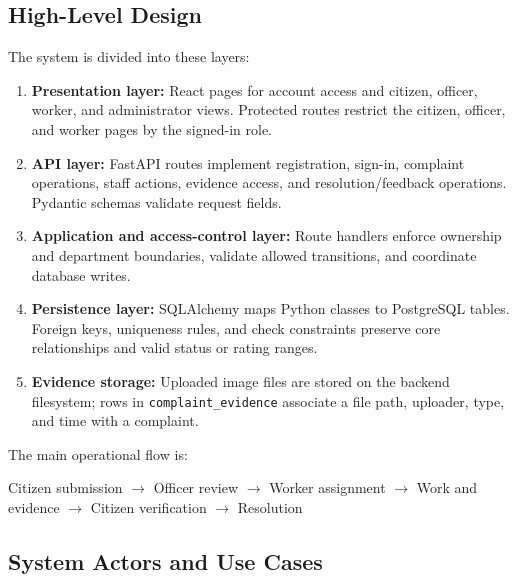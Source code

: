 \documentclass[12pt,a4paper]{report}
\begin{document}
\subsection{High-Level Design}

The system is divided into these layers:
\begin{enumerate}
\item \textbf{Presentation layer:} React pages for account access and citizen, officer, worker, and administrator views. Protected routes restrict the citizen, officer, and worker pages by the signed-in role.
\item \textbf{API layer:} FastAPI routes implement registration, sign-in, complaint operations, staff actions, evidence access, and resolution/feedback operations. Pydantic schemas validate request fields.
\item \textbf{Application and access-control layer:} Route handlers enforce ownership and department boundaries, validate allowed transitions, and coordinate database writes.
\item \textbf{Persistence layer:} SQLAlchemy maps Python classes to PostgreSQL tables. Foreign keys, uniqueness rules, and check constraints preserve core relationships and valid status or rating ranges.
\item \textbf{Evidence storage:} Uploaded image files are stored on the backend filesystem; rows in \texttt{complaint\_evidence} associate a file path, uploader, type, and time with a complaint.
\end{enumerate}

The main operational flow is:
\begin{center}\small
Citizen submission $\rightarrow$ Officer review $\rightarrow$ Worker assignment
$\rightarrow$ Work and evidence $\rightarrow$ Citizen verification $\rightarrow$ Resolution
\end{center}

\subsection{System Actors and Use Cases}
\end{document}
